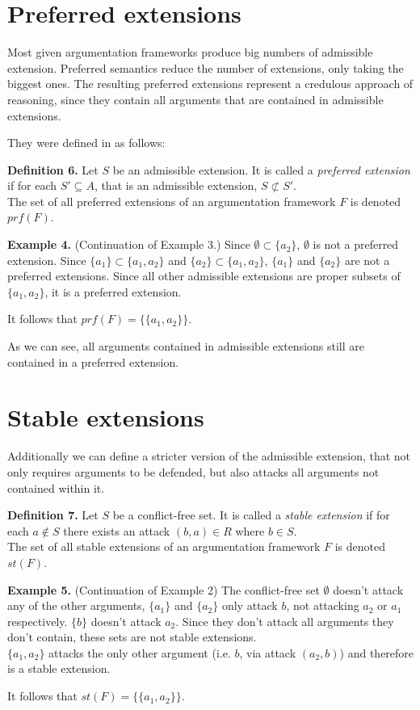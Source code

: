 \documentclass[draft,final]{vutinfth} %
\newcommand{\hl}{\par\vspace{6pt}} %
\newcommand{\cl}{\par\vspace{12pt}} %
\begin{document}
\section{Preferred extensions}

Most given argumentation frameworks produce big numbers of admissible extension. Preferred semantics reduce the number of extensions, only taking the biggest ones. The resulting preferred extensions represent a credulous approach of reasoning, since they contain all arguments that are contained in admissible extensions.\hl
They were defined in \cite{Egly} as follows:\cl

\textbf{Definition 6.} Let $S$ be an admissible extension. It is called a \emph{preferred extension} if for each $S'\subseteq A$, that is an admissible extension, $S\not\subset S'$.\\
The set of all preferred extensions of an argumentation framework $F$ is denoted $prf(F)$.\cl

\textbf{Example 4.} (Continuation of Example 3.) Since $\emptyset\subset\{a_2\}$, \(\emptyset\) is not a preferred extension. Since $\{a_1\}\subset\{a_1,a_2\}$ and $\{a_2\}\subset\{a_1,a_2\}$, $\{a_1\}$ and $\{a_2\}$ are not a preferred extensions. Since all other admissible extensions are proper subsets of $\{a_1,a_2\}$, it is a preferred extension.\hl
It follows that $prf(F)=\{\{a_1,a_2\}\}$.\hl
As we can see, all arguments contained in admissible extensions still are contained in a preferred extension.\cl

\section{Stable extensions}

Additionally we can define a stricter version of the admissible extension, that not only requires arguments to be defended, but also attacks all arguments not contained within it.\cl

\textbf{Definition 7.} Let $S$ be a conflict-free set. It is called a \emph{stable extension} if for each $a\not\in S$ there exists an attack $(b,a)\in R$ where $b\in S$.\\
The set of all stable extensions of an argumentation framework $F$ is denoted $st(F)$.\cl

\textbf{Example 5.} (Continuation of Example 2) The conflict-free set $\emptyset$ doesn't attack any of the other arguments, $\{a_1\}$ and $\{a_2\}$ only attack $b$, not attacking $a_2$ or $a_1$ respectively. $\{b\}$ doesn't attack $a_2$. Since they don't attack all arguments they don't contain, these sets are not stable extensions.\\
$\{a_1,a_2\}$ attacks the only other argument (i.e. $b$, via attack $(a_2,b)$) and therefore is a stable extension.\hl
It follows that $st(F)=\{\{a_1,a_2\}\}$.\cl
\end{document}

